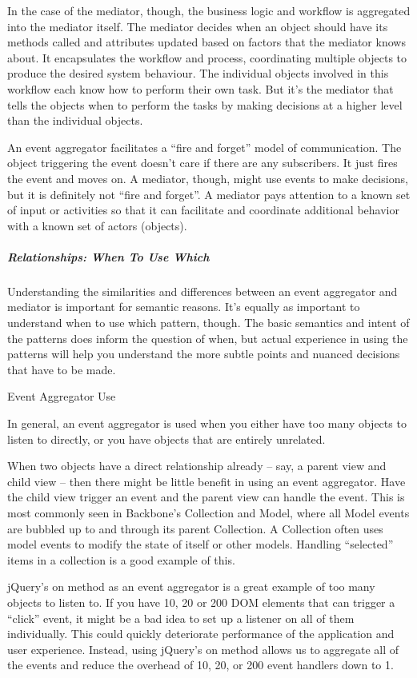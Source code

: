\documentclass[9pt]{book}
\begin{document}
In the case of the mediator, though, the business logic and workflow is
aggregated into the mediator itself. The mediator decides when an object
should have its methods called and attributes updated based on factors
that the mediator knows about. It encapsulates the workflow and process,
coordinating multiple objects to produce the desired system behaviour.
The individual objects involved in this workflow each know how to
perform their own task. But it's the mediator that tells the objects
when to perform the tasks by making decisions at a higher level than the
individual objects.

An event aggregator facilitates a ``fire and forget'' model of
communication. The object triggering the event doesn't care if there are
any subscribers. It just fires the event and moves on. A mediator,
though, might use events to make decisions, but it is definitely not
``fire and forget''. A mediator pays attention to a known set of input
or activities so that it can facilitate and coordinate additional
behavior with a known set of actors (objects).

\subparagraph{Relationships: When To Use
Which}\label{relationships-when-to-use-which}

Understanding the similarities and differences between an event
aggregator and mediator is important for semantic reasons. It's equally
as important to understand when to use which pattern, though. The basic
semantics and intent of the patterns does inform the question of when,
but actual experience in using the patterns will help you understand the
more subtle points and nuanced decisions that have to be made.

Event Aggregator Use

In general, an event aggregator is used when you either have too many
objects to listen to directly, or you have objects that are entirely
unrelated.

When two objects have a direct relationship already -- say, a parent
view and child view -- then there might be little benefit in using an
event aggregator. Have the child view trigger an event and the parent
view can handle the event. This is most commonly seen in Backbone's
Collection and Model, where all Model events are bubbled up to and
through its parent Collection. A Collection often uses model events to
modify the state of itself or other models. Handling ``selected'' items
in a collection is a good example of this.

jQuery's on method as an event aggregator is a great example of too many
objects to listen to. If you have 10, 20 or 200 DOM elements that can
trigger a ``click'' event, it might be a bad idea to set up a listener
on all of them individually. This could quickly deteriorate performance
of the application and user experience. Instead, using jQuery's on
method allows us to aggregate all of the events and reduce the overhead
of 10, 20, or 200 event handlers down to 1.
\end{document}
